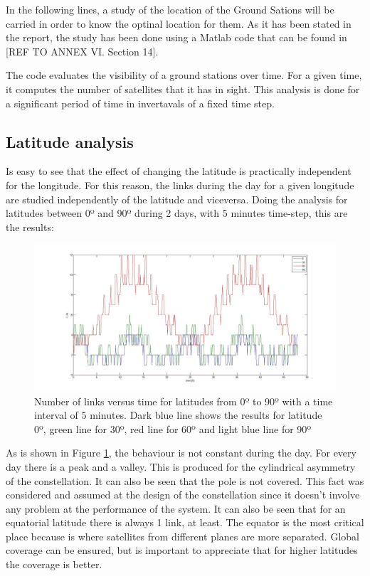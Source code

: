 In the following lines, a study of the location of the Ground Sations will be carried in order to know the optinal location for them. As it has been stated in the report, the study has been done using a Matlab code that can be found in [{REF TO ANNEX VI. Section 14}].

The code evaluates the visibility of a ground stations over time. For a given time, it computes the number of satellites that it has in sight. This analysis is done for a significant period of time in invertavals of a fixed time step.

\subsection{Latitude analysis}
Is easy to see that the effect of changing the latitude is practically independent for the longitude. For this reason, the links during the day for a given longitude are studied independently of the latitude and viceversa. Doing the analysis for latitudes between 0º and 90º during 2 days, with 5 minutes time-step, this are the results:
\begin{figure}[H]
\begin{center}
\includegraphics[scale=0.30]{0_30_90_lat.jpg}
\caption[Links vs time for latitudes from 0º to 90º]{Number of links versus time for latitudes from 0º to 90º with a time interval of 5 minutes. Dark blue line shows the results for latitude 0º, green line for 30º, red line for 60º and light blue line for 90º}
\label{fig:lat1}
\end{center}
\end{figure}
As is shown in Figure \ref{fig:lat1}, the behaviour is not constant during the day. For every day there is a peak and a valley. This is produced for the cylindrical asymmetry of the constellation. It can also be seen that the pole is not covered. This fact was considered and assumed at the design of the constellation since it doesn't involve any problem at the performance of the system. It can also be seen that for an equatorial latitude there is always 1 link, at least. The equator is the most critical place because is where satellites from different planes are more separated. Global coverage can be ensured, but is important to appreciate that for higher latitudes the coverage is better.

